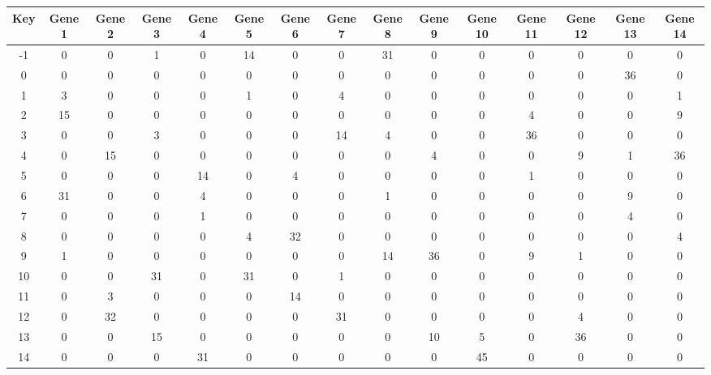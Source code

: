 \begin{tabular}{|c|c|c|c|c|c|c|c|c|c|c|c|c|c|c|}
\hline
Key & Gene 1 & Gene 2 & Gene 3 & Gene 4 & Gene 5 & Gene 6 & Gene 7 & Gene 8 & Gene 9 & Gene 10 & Gene 11 & Gene 12 & Gene 13 & Gene 14 \\
\hline
-1 & 0 & 0 & 1 & 0 & 14 & 0 & 0 & 31 & 0 & 0 & 0 & 0 & 0 & 0 \\
0 & 0 & 0 & 0 & 0 & 0 & 0 & 0 & 0 & 0 & 0 & 0 & 0 & 36 & 0 \\
1 & 3 & 0 & 0 & 0 & 1 & 0 & 4 & 0 & 0 & 0 & 0 & 0 & 0 & 1 \\
2 & 15 & 0 & 0 & 0 & 0 & 0 & 0 & 0 & 0 & 0 & 4 & 0 & 0 & 9 \\
3 & 0 & 0 & 3 & 0 & 0 & 0 & 14 & 4 & 0 & 0 & 36 & 0 & 0 & 0 \\
4 & 0 & 15 & 0 & 0 & 0 & 0 & 0 & 0 & 4 & 0 & 0 & 9 & 1 & 36 \\
5 & 0 & 0 & 0 & 14 & 0 & 4 & 0 & 0 & 0 & 0 & 1 & 0 & 0 & 0 \\
6 & 31 & 0 & 0 & 4 & 0 & 0 & 0 & 1 & 0 & 0 & 0 & 0 & 9 & 0 \\
7 & 0 & 0 & 0 & 1 & 0 & 0 & 0 & 0 & 0 & 0 & 0 & 0 & 4 & 0 \\
8 & 0 & 0 & 0 & 0 & 4 & 32 & 0 & 0 & 0 & 0 & 0 & 0 & 0 & 4 \\
9 & 1 & 0 & 0 & 0 & 0 & 0 & 0 & 14 & 36 & 0 & 9 & 1 & 0 & 0 \\
10 & 0 & 0 & 31 & 0 & 31 & 0 & 1 & 0 & 0 & 0 & 0 & 0 & 0 & 0 \\
11 & 0 & 3 & 0 & 0 & 0 & 14 & 0 & 0 & 0 & 0 & 0 & 0 & 0 & 0 \\
12 & 0 & 32 & 0 & 0 & 0 & 0 & 31 & 0 & 0 & 0 & 0 & 4 & 0 & 0 \\
13 & 0 & 0 & 15 & 0 & 0 & 0 & 0 & 0 & 10 & 5 & 0 & 36 & 0 & 0 \\
14 & 0 & 0 & 0 & 31 & 0 & 0 & 0 & 0 & 0 & 45 & 0 & 0 & 0 & 0 \\
\hline
\end{tabular}